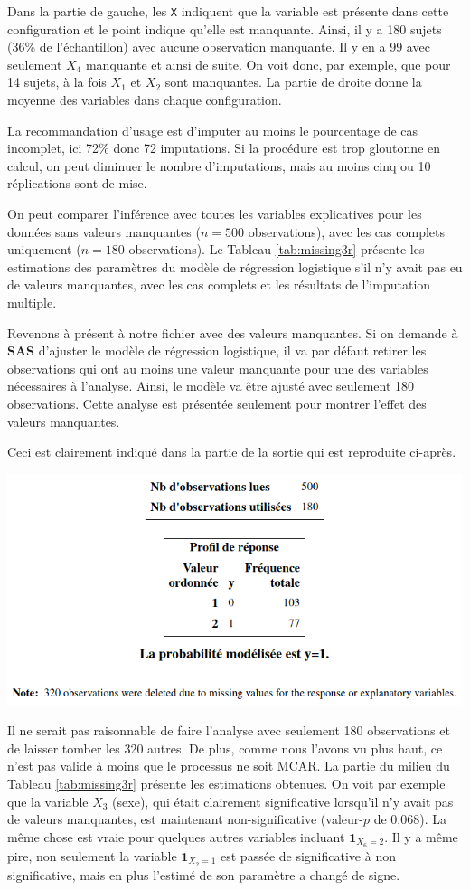 \documentclass[
  11pt,
  letterpaper,
]{book}
\theoremstyle{definition}
\theoremstyle{definition}
\theoremstyle{definition}
\theoremstyle{definition}
\theoremstyle{remark}
\begin{document}
Dans la partie de gauche, les \texttt{X} indiquent que la variable est présente dans cette configuration et le point indique qu'elle est manquante. Ainsi, il y a 180 sujets (36\% de l'échantillon) avec aucune observation manquante. Il y en a 99 avec seulement \(X_4\) manquante et ainsi de suite. On voit donc, par exemple, que pour 14 sujets, à la fois \(X_1\) et \(X_2\) sont manquantes. La partie de droite donne la moyenne des variables dans chaque configuration.

La recommandation d'usage est d'imputer au moins le pourcentage de cas incomplet, ici 72\% donc 72 imputations. Si la procédure est trop gloutonne en calcul, on peut diminuer le nombre d'imputations, mais au moins cinq ou 10 réplications sont de mise.

On peut comparer l'inférence avec toutes les variables explicatives pour les données sans valeurs manquantes (\(n=500\) observations), avec les cas complets uniquement (\(n=180\) observations).
Le Tableau \ref{tab:missing3r} présente les estimations des paramètres du modèle de régression logistique s'il n'y avait pas eu de valeurs manquantes, avec les cas complets et les résultats de l'imputation multiple.

Revenons à présent à notre fichier avec des valeurs manquantes. Si on demande à \textbf{SAS} d'ajuster le modèle de régression logistique, il va par défaut retirer les observations qui ont au moins une valeur manquante pour une des variables nécessaires à l'analyse. Ainsi, le modèle va être ajusté avec seulement 180 observations. Cette analyse est présentée seulement pour montrer l'effet des valeurs manquantes.

Ceci est clairement indiqué dans la partie de la sortie qui est reproduite ci-après.

\begin{center}\includegraphics[width=0.8\linewidth]{figures/06-manquantes-e3} \end{center}

Il ne serait pas raisonnable de faire l'analyse avec seulement 180 observations et de laisser tomber les 320 autres. De plus, comme nous l'avons vu plus haut, ce n'est pas valide à moins que le processus ne soit MCAR. La partie du milieu du Tableau \ref{tab:missing3r} présente les estimations obtenues. On voit par exemple que la variable \(X_3\) (sexe), qui était clairement significative lorsqu'il n'y avait pas de valeurs manquantes, est maintenant non-significative (valeur-\(p\) de 0,068). La même chose est vraie pour quelques autres variables incluant \({\mathbf 1}_{X_6=2}\). Il y a même pire, non seulement la variable \({\mathbf 1}_{X_2=1}\) est passée de significative à non significative, mais en plus l'estimé de son paramètre a changé de signe.
\end{document}
